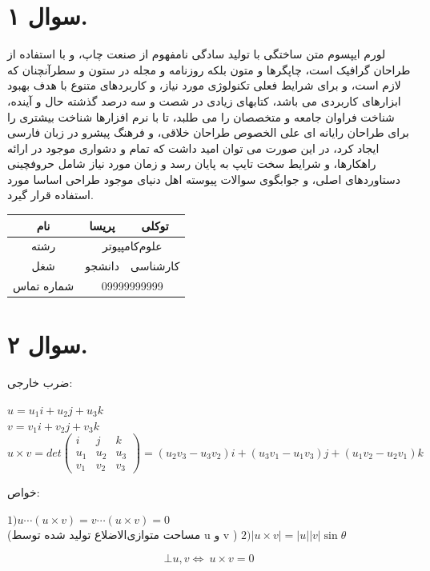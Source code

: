 \documentclass[]{article}
\begin{document}
\section*{سوال ۱.}
لورم ایپسوم متن ساختگی با تولید سادگی نامفهوم از صنعت چاپ، و با استفاده از طراحان گرافیک است، چاپگرها و متون بلکه روزنامه و مجله در ستون و سطرآنچنان که لازم است، و برای شرایط فعلی تکنولوژی مورد نیاز، و کاربردهای متنوع با هدف بهبود ابزارهای کاربردی می باشد، کتابهای زیادی در شصت و سه درصد گذشته حال و آینده، شناخت فراوان جامعه و متخصصان را می طلبد، تا با نرم افزارها شناخت بیشتری را برای طراحان رایانه ای علی الخصوص طراحان خلاقی، و فرهنگ پیشرو در زبان فارسی ایجاد کرد، در این صورت می توان امید داشت که تمام و دشواری موجود در ارائه راهکارها، و شرایط سخت تایپ به پایان رسد و زمان مورد نیاز شامل حروفچینی دستاوردهای اصلی، و جوابگوی سوالات پیوسته اهل دنیای موجود طراحی اساسا مورد استفاده قرار گیرد.
  \begin{center}
    \begin{tabular}{|c|c|c|}
    \hline
         نام & پریسا & توکلی \\
    \hline

رشته &
\multicolumn{2}{|c|}{علوم‌کامپیوتر}
\\
\hline
         شغل & دانشجو & کارشناسی \\
    \hline 
    
    شماره تماس &
\multicolumn{2}{|c|}{09999999999}
\\
\hline
    
    \end{tabular}
  \end{center}
\begin{center}
\end{center}
\newpage
\section*{سوال ۲.}
ضرب خارجی:\\
\begin{flushleft}
$
u = u_1i + u_2j+u_3k $
\\
$
v = v_1i + v_2j +v_3k
$
\\
$
u \times v = det 
\begin{pmatrix}
i & j & k\\
u_1& u_2 & u_3\\
v_1 & v_2 & v_3
\end{pmatrix} = 
(u_2v_3 - u_3v_2)i + (u_3v_1 - u_1v_3)j + (u_1v_2 - u_2v_1)k
$
\\
\end{flushleft}
خواص:
\begin{flushleft}
$ 
1) u \cdots (u \times v) = v \cdots (u \times v) = 0 $
\\

(مساحت متوازی‌الاضلاع تولید شده توسط u و v )
$
2) \lvert u \times v \rvert = |u||v| \sin \theta 
$

\[\bot u ,  v  \iff \ u \times v = 0 \]
\end{flushleft}
\newpage
\end{document}
